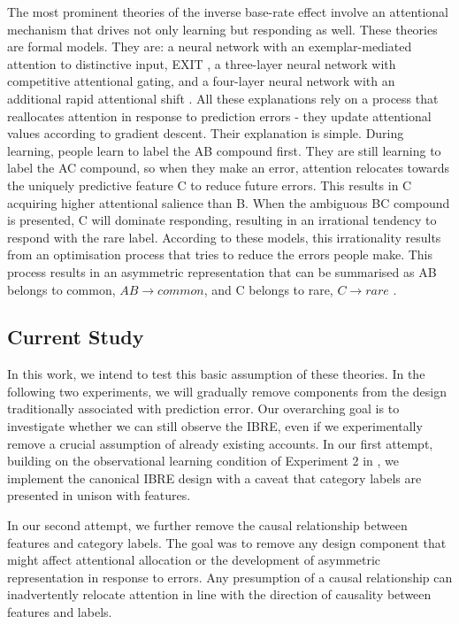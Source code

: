 \documentclass[10pt,letterpaper]{article}
\begin{document}
The most prominent theories of the inverse base-rate effect involve an attentional mechanism that drives not only learning but responding as well.
These theories are formal models.
They are: a neural network with an exemplar-mediated attention to distinctive input, EXIT \cite{kruschke2001toward}, a three-layer neural network with competitive attentional gating, and a four-layer neural network with an additional rapid attentional shift \cite{paskewitz2020dissecting}.
All these explanations rely on a process that reallocates attention in response to prediction errors - they update attentional values according to gradient descent.
Their explanation is simple.
During learning, people learn to label the AB compound first.
They are still learning to label the AC compound, so when they make an error, attention relocates towards the uniquely predictive feature C to reduce future errors.
This results in C acquiring higher attentional salience than B.
When the ambiguous BC compound is presented, C will dominate responding, resulting in an irrational tendency to respond with the rare label.
According to these models, this irrationality results from an optimisation process that tries to reduce the errors people make.
This process results in an asymmetric representation that can be summarised as AB belongs to common, $AB \to common$, and C belongs to rare, $C \to rare$ \cite{kruschke2001inverse}.

\subsection{Current Study}

In this work, we intend to test this basic assumption of these theories.
In the following two experiments, we will gradually remove components from the design traditionally associated with prediction error.
Our overarching goal is to investigate whether we can still observe the IBRE, even if we experimentally remove a crucial assumption of already existing accounts.
In our first attempt, building on the observational learning condition of Experiment 2 in , we implement the canonical IBRE design with a caveat that category labels are presented in unison with features.

In our second attempt, we further remove the causal relationship between features and category labels.
The goal was to remove any design component that might affect attentional allocation or the development of asymmetric representation in response to errors.
Any presumption of a causal relationship can inadvertently relocate attention in line with the direction of causality between features and labels.
\end{document}
